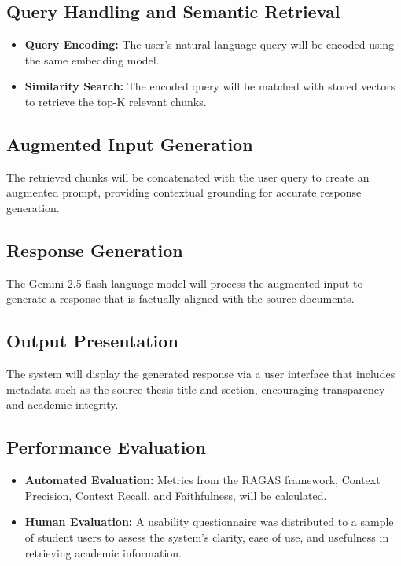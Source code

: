 \begin{refsection}
\subsection*{Query Handling and Semantic Retrieval}

\begin{itemize}
    \item \textbf{Query Encoding:} The user’s natural language query will be encoded using the same embedding model.
    \item \textbf{Similarity Search:} The encoded query will be matched with stored vectors to retrieve the top-K relevant chunks.
\end{itemize}

\subsection*{Augmented Input Generation}

The retrieved chunks will be concatenated with the user query to create an augmented prompt, providing contextual grounding for accurate response generation.

\subsection*{Response Generation}

The Gemini 2.5-flash language model will process the augmented input to generate a response that is factually aligned with the source documents.

\subsection*{Output Presentation}

The system will display the generated response via a user interface that includes metadata such as the source thesis title and section, encouraging transparency and academic integrity.

\subsection*{Performance Evaluation}

\begin{itemize}
    \item \textbf{Automated Evaluation:} Metrics from the RAGAS framework, Context Precision, Context Recall, and Faithfulness, will be calculated.
    \item \textbf{Human Evaluation:} A usability questionnaire was distributed to a sample of student users to assess the system’s clarity, ease of use, and usefulness in retrieving academic information.
\end{itemize}


\end{refsection}
